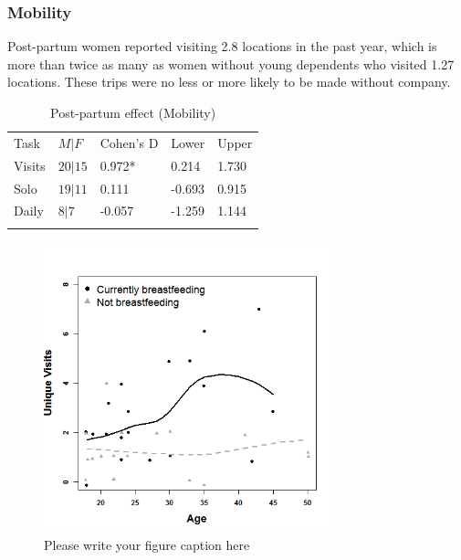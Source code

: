 		\subsubsection{Mobility}
		\label{sec:3.3.3}
Post-partum women reported visiting 2.8 locations in the past year, which is more than twice as many as women without young dependents who visited 1.27 locations.  These trips were no less or more likely to be made without company.

\begin{table}[h!]
\caption{Post-partum effect (Mobility)}
\label{tab:bf_mob}  
\begin{tabular}{lllll}
\hline\noalign{\smallskip}
Task & $M|F$ & Cohen's D & Lower & Upper  \\
\noalign{\smallskip}\hline\noalign{\smallskip}
Visits & $20|15$ & \phantom{-}0.972* & \phantom{-}0.214 & \phantom{-}1.730 \\
Solo & $19|11$ & \phantom{-}0.111 & -0.693 & \phantom{-}0.915\\
Daily & $8|7$ & -0.057 & -1.259 & \phantom{-}1.144 \\
\noalign{\smallskip}\hline
\end{tabular}
\end{table}
		
\begin{figure}[!htb]
  \includegraphics[width=0.75\textwidth]{bfeed_tot}
\caption{Please write your figure caption here}
\label{fig:1}       %
\end{figure}



